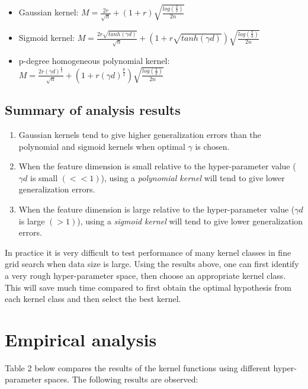\documentclass{article}
\begin{document}
\begin{itemize}
  \item Gaussian kernel: $M = \frac{2r}{\sqrt{n}} + (1+r) \sqrt{ \frac{ log(\frac{2}{\delta})}{2n} }$
  \item Sigmoid kernel: $M = \frac{2r\sqrt{tanh(\gamma  d)}}{\sqrt{n}} + (1+r\sqrt{tanh(\gamma  d)}) \sqrt{ \frac{ log(\frac{2}{\delta})}{2n} }$
  \item p-degree homogeneous polynomial kernel: $M = \frac{2r(\gamma d)^\frac{p}{2}}{\sqrt{n}} + (1+r(\gamma d)^\frac{p}{2}) \sqrt{ \frac{ log(\frac{2}{\delta})}{2n} }$
\end{itemize} 


\subsection{Summary of analysis results}
\begin{enumerate}
  \item Gaussian kernels tend to give higher generalization errors than the polynomial and sigmoid kernels when optimal $\gamma$ is chosen. 
  
  \item When the feature dimension is small relative to the hyper-parameter value ($\gamma d$ is small $(<<1)$), using a \textit{polynomial kernel} will tend to give lower generalization errors.
    
  \item When the feature dimension is large relative to the hyper-parameter value ($\gamma d$ is large $(>1)$), using a \textit{sigmoid kernel} will tend to give lower generalization errors.  
\end{enumerate}

In practice it is very difficult to test performance of many kernel classes in fine grid search when data size is large. Using the results above, one can first identify a very rough hyper-parameter space, then choose an appropriate kernel class. This will save much time compared to first obtain the optimal hypothesis from each kernel class and then select the best kernel. 

\section{Empirical analysis} 
Table 2 below compares the results of the kernel functions using different hyper-parameter spaces. The following results are observed: \\
\end{document}

